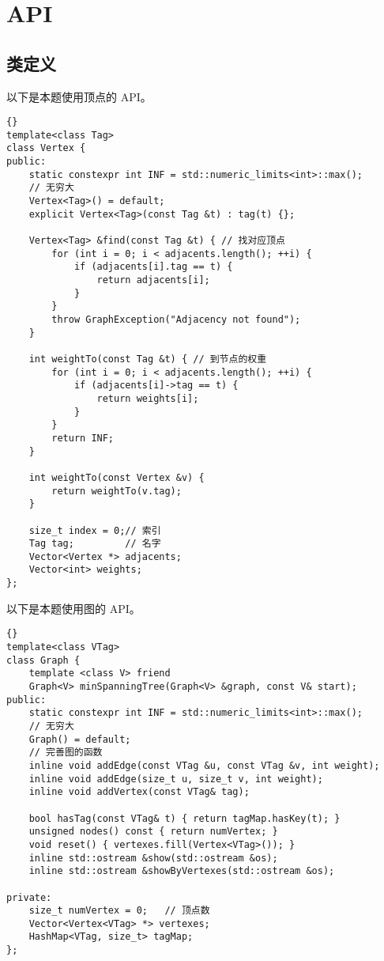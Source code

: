 \section{API}

\subsection{类定义}
以下是本题使用顶点的 API。
\begin{lstlisting}[morendkeywords={Vertex}, firstnumber=810, caption=Vertex 类定义]{}
template<class Tag>
class Vertex {
public:
    static constexpr int INF = std::numeric_limits<int>::max();
    // 无穷大
    Vertex<Tag>() = default;
    explicit Vertex<Tag>(const Tag &t) : tag(t) {};

    Vertex<Tag> &find(const Tag &t) { // 找对应顶点
        for (int i = 0; i < adjacents.length(); ++i) {
            if (adjacents[i].tag == t) {
                return adjacents[i];
            }
        }
        throw GraphException("Adjacency not found");
    }

    int weightTo(const Tag &t) { // 到节点的权重
        for (int i = 0; i < adjacents.length(); ++i) {
            if (adjacents[i]->tag == t) {
                return weights[i];
            }
        }
        return INF;
    }

    int weightTo(const Vertex &v) {
        return weightTo(v.tag);
    }

    size_t index = 0;// 索引
    Tag tag;         // 名字
    Vector<Vertex *> adjacents;
    Vector<int> weights;
};
\end{lstlisting}

以下是本题使用图的 API。
\begin{lstlisting}[morendkeywords={Graph}, firstnumber=847, caption=Graph 类定义]{}
template<class VTag>
class Graph {
    template <class V> friend
    Graph<V> minSpanningTree(Graph<V> &graph, const V& start);
public:
    static constexpr int INF = std::numeric_limits<int>::max();
    // 无穷大
    Graph() = default;
    // 完善图的函数
    inline void addEdge(const VTag &u, const VTag &v, int weight);
    inline void addEdge(size_t u, size_t v, int weight);
    inline void addVertex(const VTag& tag);

    bool hasTag(const VTag& t) { return tagMap.hasKey(t); }
    unsigned nodes() const { return numVertex; }
    void reset() { vertexes.fill(Vertex<VTag>()); }
    inline std::ostream &show(std::ostream &os);
    inline std::ostream &showByVertexes(std::ostream &os);

private:
    size_t numVertex = 0;   // 顶点数
    Vector<Vertex<VTag> *> vertexes;
    HashMap<VTag, size_t> tagMap;
};
\end{lstlisting}



